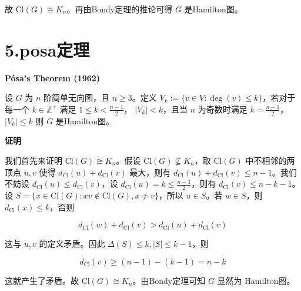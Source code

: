 \documentclass{article}
\begin{document}
故 \( \mathrm{Cl}(G) \cong K_{n} \)。再由Bondy定理的推论可得 \( G \) 是Hamilton图。
\section{5.posa定理}


\textbf{Pósa's Theorem (1962)}

设 \( G \) 为 \( n \) 阶简单无向图，且 \( n \geq 3 \)。定义 \( V_{k}:=\{v \in V: \operatorname{deg}(v) \leq k\} \)，若对于每一个 \( k \in \mathbb{Z}^{+} \) 满足 \( 1 \leq k < \frac{n-1}{2} \)， \( \left|V_{k}\right| < k \)，且当 \( n \) 为奇数时满足 \( k=\frac{n-1}{2}\)， \( \left|V_{k}\right| \leq k \) 则 \( G \) 是Hamilton图。

\textbf{证明}

我们首先来证明 \( \mathrm{Cl}(G) \cong K_{n} \)。假设 \( \mathrm{Cl}(G) \nsubseteq K_{n} \)，取 \( \mathrm{Cl}(G) \) 中不相邻的两顶点 \( u, v \) 使得 \( d_{\mathrm{Cl}}(u)+d_{\mathrm{Cl}}(v) \) 最大，则有 \( d_{\mathrm{Cl}}(u)+d_{\mathrm{Cl}}(v) \leq n-1 \)。我们不妨设 \( d_{\mathrm{Cl}}(u) \leq d_{\mathrm{Cl}}(v) \)，设 \( d_{\mathrm{Cl}}(u)=k \leq \frac{n-1}{2} \)，则有 \( d_{\mathrm{Cl}}(v) \leq n-k-1\)。设 \( S=\{x \in \mathrm{Cl}(G): x v \notin \mathrm{Cl}(G), x \neq v\}\)，所以 \( u \in S \)。若 \( w \in S \)，则 \( d_{\mathrm{Cl}}(x) \leq k\)，否则

\[ d_{\mathrm{Cl}}(w)+d_{\mathrm{Cl}}(v) > d_{\mathrm{Cl}}(u)+d_{\mathrm{Cl}}(v) \]

这与 \( u, v \) 的定义矛盾。因此 \( \Delta(S) \leq k, |S| \leq k-1 \)，则

\[ d_{\mathrm{Cl}}(v) \geq (n-1)-(k-1) = n-k \]

这就产生了矛盾。故 \( \mathrm{Cl}(G) \cong K_{n} \)。由Bondy定理可知 \( G \) 显然为 Hamilton图。
\end{document}
